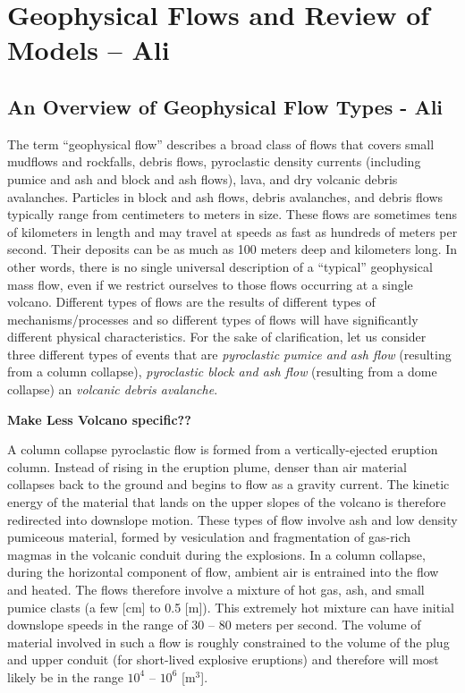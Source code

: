 \documentclass{article}
\begin{document}
\section{Geophysical Flows and Review of Models -- Ali}\label{sec:GeoPhFlows}

\subsection{An Overview of Geophysical Flow Types - Ali}\label{subsec:FlowTypes}
The term ``geophysical flow'' describes a broad class of flows that covers small mudflows and rockfalls, debris flows, pyroclastic density currents (including pumice and ash and block and ash flows), lava, and dry volcanic debris avalanches. Particles in block and ash flows, debris avalanches, and debris flows typically range from centimeters to meters in size. These flows are sometimes tens of kilometers in length and may travel at speeds as fast as hundreds of meters per second. Their deposits can be as much as 100 meters deep and kilometers long. In other words, there is no single universal description of a ``typical'' geophysical mass flow, even if we restrict ourselves to those flows occurring at a single volcano. Different types of flows are the results of different types of mechanisms/processes and so different types of flows will have significantly different physical characteristics. For the sake of clarification, let us consider three different types of events that are \textit{pyroclastic pumice and ash flow} (resulting from a column collapse), \textit{pyroclastic block and ash flow} (resulting from a dome collapse) an \textit{volcanic debris avalanche}.
  
  {\bf Make Less Volcano specific??}
  
  
A column collapse pyroclastic flow is formed from a vertically-ejected eruption column. Instead of rising in the eruption plume, denser than air material collapses back to the ground and begins to flow as a gravity current. The kinetic energy of the material that lands on the upper slopes of the volcano is therefore redirected into downslope motion. These types of flow involve ash and low density pumiceous material, formed by vesiculation and fragmentation of gas-rich magmas in the volcanic conduit during the explosions. In a column collapse, during the horizontal component of flow, ambient air is entrained into the flow and heated. The flows therefore involve a mixture of hot gas, ash, and small pumice clasts (a few [cm] to 0.5 [m]). This extremely hot mixture can have initial downslope speeds in the range of 30 -- 80 meters per second. The volume of material involved in such a flow is roughly constrained to the volume of the plug and upper conduit (for short-lived explosive eruptions) and therefore will most likely be in the range $10^4$ -- $10^6$ [$\mathrm{m^3}$].
\end{document}

